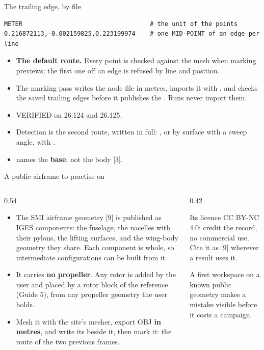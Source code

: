 \begin{frame}[fragile]{The trailing edge, by file}
\begin{lstlisting}[style=ftsbase]
METER                                   # the unit of the points
0.216872113,-0.002159825,0.223199974    # one MID-POINT of an edge per line
\end{lstlisting}
\begin{itemize}\small
  \item \textbf{The default route.} Every point is checked against the mesh
        when marking previews; the first one off an edge is refused by line
        and position.
  \item The marking pass writes the node file in metres, imports it with
        , and checks the saved trailing
        edges before it publishes the . Runs never import them.
  \item VERIFIED on 26.124 and 26.125.
  \item Detection is the second route, written in full: ,
        or by surface with a sweep angle, with .
  \item {} names the \textbf{base}, not the body [3].
\end{itemize}
\end{frame}

\begin{frame}{A public airframe to practise on}
\begin{columns}[T]
\begin{column}{0.54\textwidth}
\begin{itemize}\small
  \item The SMI airframe geometry [9] is published as IGES components: the
        fuselage, the nacelles with their pylons, the lifting surfaces, and
        the wing-body geometry they share. Each component is whole, so
        intermediate configurations can be built from it.
  \item It carries \textbf{no propeller}. Any rotor is added by the user and
        placed by a rotor block of the reference (Guide 5), from any
        propeller geometry the user holds.
  \item Mesh it with the site's mesher, export OBJ \textbf{in metres}, and
        write its  beside it, then mark it:
        the route of the two previous frames.
\end{itemize}
\end{column}
\begin{column}{0.42\textwidth}
\begin{block}{Its licence}
\small CC BY-NC 4.0: credit the record, no commercial use. Cite it as [9]
wherever a result uses it.
\end{block}
\begin{takeaway}A first workspace on a known public geometry makes a
mistake visible before it costs a campaign.\end{takeaway}
\end{column}
\end{columns}
\end{frame}

